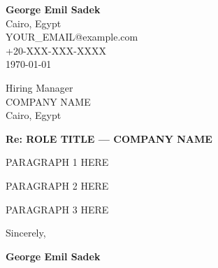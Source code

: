 \documentclass[11pt,a4paper]{article}
\newcommand{\href}[2]{#2}
\begin{document}
\begin{flushright}
  \textbf{George Emil Sadek}\\
  Cairo, Egypt\\
  \href{mailto:YOUR_EMAIL@example.com}{YOUR\_EMAIL@example.com}\\
  +20-XXX-XXX-XXXX\\
  \today
\end{flushright}

\vspace{8pt}

Hiring Manager\\
COMPANY NAME\\
Cairo, Egypt

\vspace{8pt}

\textbf{Re: ROLE TITLE --- COMPANY NAME}

\vspace{8pt}


PARAGRAPH 1 HERE

\vspace{6pt}

PARAGRAPH 2 HERE

\vspace{6pt}

PARAGRAPH 3 HERE

\vspace{16pt}

Sincerely,

\vspace{12pt}

\textbf{George Emil Sadek}
\end{document}
